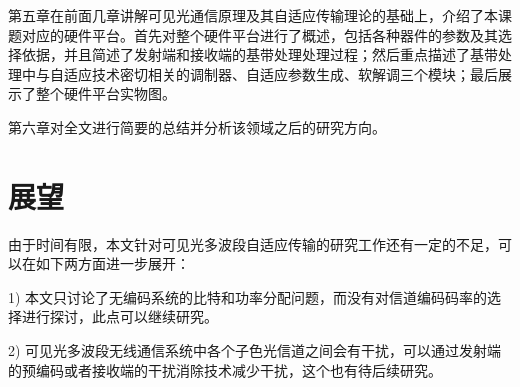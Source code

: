 第五章在前面几章讲解可见光通信原理及其自适应传输理论的基础上，介绍了本课题对应的硬件平台。首先对整个硬件平台进行了概述，包括各种器件的参数及其选择依据，并且简述了发射端和接收端的基带处理处理过程；然后重点描述了基带处理中与自适应技术密切相关的调制器、自适应参数生成、软解调三个模块；最后展示了整个硬件平台实物图。

第六章对全文进行简要的总结并分析该领域之后的研究方向。
\section{展望}
由于时间有限，本文针对可见光多波段自适应传输的研究工作还有一定的不足，可以在如下两方面进一步展开：

1) 本文只讨论了无编码系统的比特和功率分配问题，而没有对信道编码码率的选择进行探讨，此点可以继续研究。

2) 可见光多波段无线通信系统中各个子色光信道之间会有干扰，可以通过发射端的预编码或者接收端的干扰消除技术减少干扰，这个也有待后续研究。
